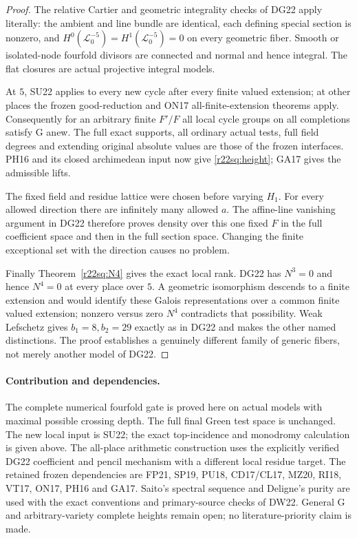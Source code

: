 \begin{proof}
The relative Cartier and geometric integrality checks
of DG22 apply literally: the ambient and line bundle
are identical, each defining special section is
nonzero, and $H^0(\mathcal L_0^{-5})=
H^1(\mathcal L_0^{-5})=0$ on every geometric fiber.
Smooth or isolated-node fourfold divisors are connected
and normal and hence integral.  The flat closures are
actual projective integral models.

At $5$, SU22 applies to every new cycle after every
finite valued extension; at other places the frozen
good-reduction and ON17 all-finite-extension theorems
apply.  Consequently for an arbitrary finite $F'/F$
all local cycle groups on all completions satisfy G
anew.  The full exact supports, all ordinary actual
tests, full field degrees and extending original
absolute values are those of the frozen interfaces.
PH16 and its closed archimedean input now give
\eqref{r22sq:height}; GA17 gives the admissible lifts.

The fixed field and residue lattice were chosen before
varying $H_1$.  For every allowed direction there are
infinitely many allowed $a$.  The affine-line vanishing
argument in DG22 therefore proves density over this
one fixed $F$ in the full coefficient space and then
in the full section space.  Changing the finite
exceptional set with the direction causes no problem.

Finally Theorem~\ref{r22sq:N4} gives the exact local
rank.  DG22 has $N^3=0$ and hence $N^4=0$ at every
place over $5$.  A geometric isomorphism descends to
a finite extension and would identify these Galois
representations over a common finite valued extension;
nonzero versus zero $N^4$ contradicts that possibility.
Weak Lefschetz gives $b_1=8,b_2=29$ exactly as in
DG22 and makes the other named distinctions.
The proof establishes a genuinely different family
of generic fibers, not merely another model of DG22.
\end{proof}

\paragraph{Contribution and dependencies.}
The complete numerical fourfold gate is proved here
on actual models with maximal possible crossing depth.
The full final Green test space is unchanged.  The
new local input is SU22; the exact top-incidence and
monodromy calculation is given above.  The all-place
arithmetic construction uses the explicitly verified
DG22 coefficient and pencil mechanism with a different
local residue target.  The retained frozen dependencies
are FP21, SP19, PU18, CD17/CL17, MZ20, RI18, VT17,
ON17, PH16 and GA17.  Saito's spectral sequence and
Deligne's purity are used with the exact conventions
and primary-source checks of DW22.  General G and
arbitrary-variety complete heights remain open;
no literature-priority claim is made.
